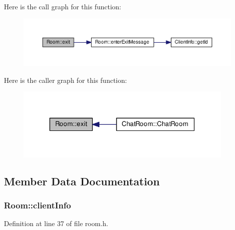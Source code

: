Here is the call graph for this function\+:
\nopagebreak
\begin{figure}[H]
\begin{center}
\leavevmode
\includegraphics[width=350pt]{class_room_a85bb6bc37f4caff36854e38cf659df62_cgraph}
\end{center}
\end{figure}




Here is the caller graph for this function\+:
\nopagebreak
\begin{figure}[H]
\begin{center}
\leavevmode
\includegraphics[width=302pt]{class_room_a85bb6bc37f4caff36854e38cf659df62_icgraph}
\end{center}
\end{figure}




\subsection{Member Data Documentation}
\subsubsection[{\texorpdfstring{client\+Info}{clientInfo}}]{ Room\+::client\+Info\hspace{0.3cm}{\ttfamily [protected]}}\hypertarget{class_room_a4dd1160fe55a497f7349488d934b1805}{}\label{class_room_a4dd1160fe55a497f7349488d934b1805}


Definition at line 37 of file room.\+h.

